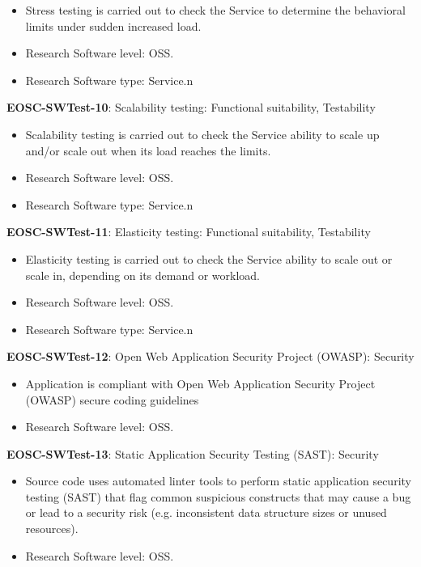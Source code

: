 \begin{itemize}
    \item Stress testing is carried out to check the Service to determine the behavioral limits under sudden increased load. \cite{orviz_fernandez_eosc-synergy_2020}
    \item Research Software level: OSS.
    \item Research Software type: Service.n\end{itemize}

\textbf{EOSC-SWTest-10}: Scalability testing: Functional suitability, Testability

\begin{itemize}
    \item Scalability testing is carried out to check the Service ability to scale up and/or scale out when its load reaches the limits. \cite{orviz_fernandez_eosc-synergy_2020}
    \item Research Software level: OSS.
    \item Research Software type: Service.n\end{itemize}

\textbf{EOSC-SWTest-11}: Elasticity testing: Functional suitability, Testability

\begin{itemize}
    \item Elasticity testing is carried out to check the Service ability to scale out or scale in, depending on its demand or workload. \cite{orviz_fernandez_eosc-synergy_2020}
    \item Research Software level: OSS.
    \item Research Software type: Service.n\end{itemize}

\textbf{EOSC-SWTest-12}: Open Web Application Security Project (OWASP): Security

\begin{itemize}
    \item Application is compliant with Open Web Application Security Project (OWASP) secure coding guidelines \cite{orviz_set_2017}
    \item Research Software level: OSS.
\end{itemize}

\textbf{EOSC-SWTest-13}: Static Application Security Testing (SAST): Security

\begin{itemize}
    \item Source code uses automated linter tools to perform static application security testing (SAST) that flag common suspicious constructs that may cause a bug or lead to a security risk (e.g. inconsistent data structure sizes or unused resources). \cite{orviz_set_2017}
    \item Research Software level: OSS.
\end{itemize}

